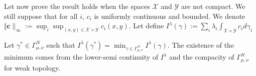 \begin{prv*}

\medskip

Let now prove  the result holds when the spaces $\mathcal{X}$ and $\mathcal{Y}$ are not compact. We still suppose that for all $i$, $c_i$ is uniformly continuous and bounded. We denote $\Vert\mathbf{c}\rVert_\infty := \sup_i \sup_{(x,y)\in\mathcal{X}\times\mathcal{Y}} c_i(x,y)$.  Let define $I^\lambda(\gamma):=\sum_i\lambda_i\int_{\mathcal{X}\times\mathcal{Y}}c_id\gamma_i$

Let $\gamma^*\in \Gamma^N_{\mu,\nu}$ such that $I^\lambda(\gamma^*) =\min_{\gamma\in\Gamma^N_{\mu,\nu}}I^\lambda(\gamma)$.  The existence of the minimum comes from the lower-semi continuity of $I^\lambda$ and  the compacity of $\Gamma^N_{\mu,\nu}$ for weak topology.


\end{prv*}
